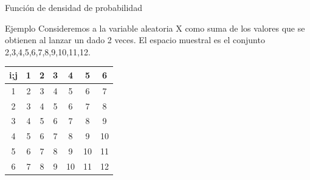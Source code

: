 \documentclass[11pt]{beamer}
\begin{document}
        \begin{frame}{Función de densidad de probabilidad}
          \begin{block}{Ejemplo}
             Consideremos a la variable aleatoria X como suma de los valores que se obtienen al lanzar un dado 2 veces. El espacio muestral es el conjunto {2,3,4,5,6,7,8,9,10,11,12}.
          \end{block}
          \begin{center}
              \begin{tabular}{c|cccccc}
                 i;j & 1 & 2 & 3 & 4 & 5 & 6 \\
                  \hline
                  1 & 2 & 3 & 4 & 5 & 6 & 7 \\
                  2 & 3 & 4 & 5 & 6 & 7 & 8 \\
                  3 & 4 & 5 & 6 & 7 & 8 & 9 \\
                  4 & 5 & 6 & 7 & 8 & 9 & 10 \\
                  5 & 6 & 7 & 8 & 9 & 10 & 11 \\
                  6 & 7 & 8 & 9 & 10 & 11 & 12 \\
              \end{tabular}
          \end{center}
        \end{frame}
\end{document}
